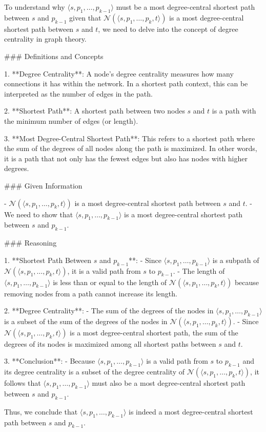 To understand why \(\langle s, p_1, \ldots, p_{k-1} \rangle\) must be a most degree-central shortest path between \(s\) and \(p_{k-1}\) given that \(\mathcal{N}(\langle s, p_1, \ldots, p_k, t \rangle)\) is a most degree-central shortest path between \(s\) and \(t\), we need to delve into the concept of degree centrality in graph theory.

### Definitions and Concepts

1. **Degree Centrality**: A node's degree centrality measures how many connections it has within the network. In a shortest path context, this can be interpreted as the number of edges in the path.

2. **Shortest Path**: A shortest path between two nodes \(s\) and \(t\) is a path with the minimum number of edges (or length).

3. **Most Degree-Central Shortest Path**: This refers to a shortest path where the sum of the degrees of all nodes along the path is maximized. In other words, it is a path that not only has the fewest edges but also has nodes with higher degrees.

### Given Information

- \(\mathcal{N}(\langle s, p_1, \ldots, p_k, t \rangle)\) is a most degree-central shortest path between \(s\) and \(t\).
- We need to show that \(\langle s, p_1, \ldots, p_{k-1} \rangle\) is a most degree-central shortest path between \(s\) and \(p_{k-1}\).

### Reasoning

1. **Shortest Path Between \(s\) and \(p_{k-1}\)**:
   - Since \(\langle s, p_1, \ldots, p_{k-1} \rangle\) is a subpath of \(\mathcal{N}(\langle s, p_1, \ldots, p_k, t \rangle)\), it is a valid path from \(s\) to \(p_{k-1}\).
   - The length of \(\langle s, p_1, \ldots, p_{k-1} \rangle\) is less than or equal to the length of \(\mathcal{N}(\langle s, p_1, \ldots, p_k, t \rangle)\) because removing nodes from a path cannot increase its length.

2. **Degree Centrality**:
   - The sum of the degrees of the nodes in \(\langle s, p_1, \ldots, p_{k-1} \rangle\) is a subset of the sum of the degrees of the nodes in \(\mathcal{N}(\langle s, p_1, \ldots, p_k, t \rangle)\).
   - Since \(\mathcal{N}(\langle s, p_1, \ldots, p_k, t \rangle)\) is a most degree-central shortest path, the sum of the degrees of its nodes is maximized among all shortest paths between \(s\) and \(t\).

3. **Conclusion**:
   - Because \(\langle s, p_1, \ldots, p_{k-1} \rangle\) is a valid path from \(s\) to \(p_{k-1}\) and its degree centrality is a subset of the degree centrality of \(\mathcal{N}(\langle s, p_1, \ldots, p_k, t \rangle)\), it follows that \(\langle s, p_1, \ldots, p_{k-1} \rangle\) must also be a most degree-central shortest path between \(s\) and \(p_{k-1}\).

Thus, we conclude that \(\langle s, p_1, \ldots, p_{k-1} \rangle\) is indeed a most degree-central shortest path between \(s\) and \(p_{k-1}\).